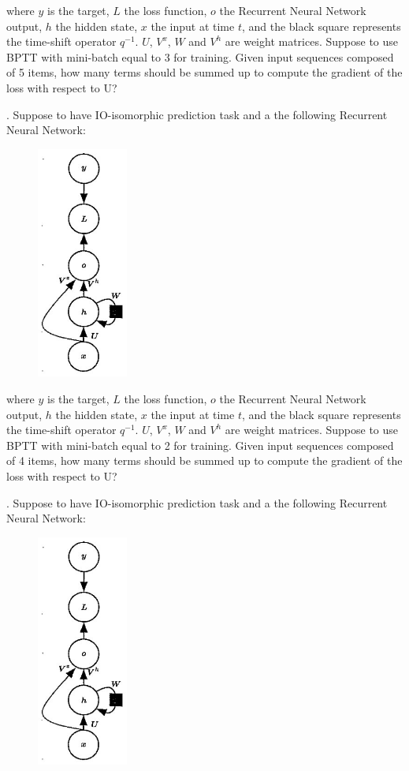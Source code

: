 where $y$ is the target, $L$ the loss function, $o$ the Recurrent Neural Network output, $h$ the hidden state, $x$ the input at time $t$, and the black square represents the time-shift operator $q^{-1}$. $U$, $V^{x}$, $W$ and $V^{h}$ are weight matrices. Suppose to use BPTT with mini-batch equal to 3 for training. Given input sequences composed of 5 items, how many terms should be summed up to compute the gradient of the loss with respect to U?


. Suppose to have IO-isomorphic prediction task and a the following Recurrent Neural Network:

\begin{figure}[h]
    \centering
    \includegraphics[width=3cm]{Images/io-isomorphic-rnn.jpg}
    \label{fig:io-rnn}
\end{figure}

where $y$ is the target, $L$ the loss function, $o$ the Recurrent Neural Network output, $h$ the hidden state, $x$ the input at time $t$, and the black square represents the time-shift operator $q^{-1}$. $U$, $V^{x}$, $W$ and $V^{h}$ are weight matrices. Suppose to use BPTT with mini-batch equal to 2 for training. Given input sequences composed of 4 items, how many terms should be summed up to compute the gradient of the loss with respect to U?

\newpage
{}. Suppose to have IO-isomorphic prediction task and a the following Recurrent Neural Network:

\begin{figure}[h]
    \centering
    \includegraphics[width=3cm]{Images/io-isomorphic-rnn.jpg}
    \label{fig:io-rnn}
\end{figure}


